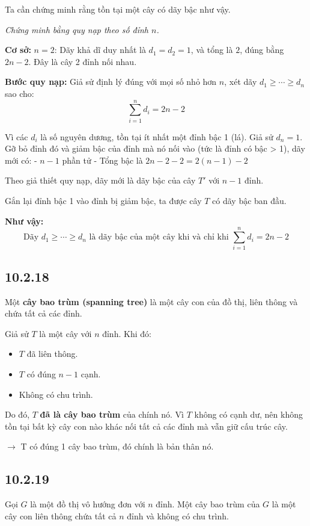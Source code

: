 \documentclass{article}
\begin{document}
	Ta cần chứng minh rằng tồn tại một cây có dãy bậc như vậy.
	
	\textit{Chứng minh bằng quy nạp theo số đỉnh $n$.}
	
	\textbf{Cơ sở:} \( n = 2 \): Dãy khả dĩ duy nhất là \( d_1 = d_2 = 1 \), và tổng là \( 2 \), đúng bằng \( 2n - 2 \). Đây là cây 2 đỉnh nối nhau.
	
	\textbf{Bước quy nạp:} Giả sử định lý đúng với mọi số nhỏ hơn $n$, xét dãy $d_1 \geq \cdots \geq d_n$ sao cho:
	\[
	\sum_{i=1}^{n} d_i = 2n - 2
	\]
	
	Vì các $d_i$ là số nguyên dương, tồn tại ít nhất một đỉnh bậc 1 (lá). Giả sử \( d_n = 1 \).  
	Gỡ bỏ đỉnh đó và giảm bậc của đỉnh mà nó nối vào (tức là đỉnh có bậc > 1), dãy mới có:
	- $n - 1$ phần tử
	- Tổng bậc là \( 2n - 2 - 2 = 2(n - 1) - 2 \)
	
	Theo giả thiết quy nạp, dãy mới là dãy bậc của cây $T'$ với $n - 1$ đỉnh.
	
	Gắn lại đỉnh bậc 1 vào đỉnh bị giảm bậc, ta được cây $T$ có dãy bậc ban đầu.
	
	\vspace{1em}
	\noindent \textbf{Như vậy:}
	\[
	\boxed{\text{Dãy } d_1 \geq \cdots \geq d_n \text{ là dãy bậc của một cây khi và chỉ khi } \sum_{i=1}^n d_i = 2n - 2}
	\]
	
	\subsection*{10.2.18}
	Một \textbf{cây bao trùm (spanning tree)} là một cây con của đồ thị, liên thông và chứa tất cả các đỉnh.
	
	Giả sử $T$ là một cây với $n$ đỉnh. Khi đó:
	\begin{itemize}
		\item $T$ đã liên thông.
		\item $T$ có đúng $n - 1$ cạnh.
		\item Không có chu trình.
	\end{itemize}
	
	Do đó, $T$ \textbf{đã là cây bao trùm} của chính nó.  
	Vì $T$ không có cạnh dư, nên không tồn tại bất kỳ cây con nào khác nối tất cả các đỉnh mà vẫn giữ cấu trúc cây.
	
	$\rightarrow$ T có đúng 1 cây bao trùm, đó chính là bản thân nó.
	
	\subsection*{10.2.19}
	Gọi $G$ là một đồ thị vô hướng đơn với $n$ đỉnh.  
	Một cây bao trùm của $G$ là một cây con liên thông chứa tất cả $n$ đỉnh và không có chu trình.
	
\end{document}
